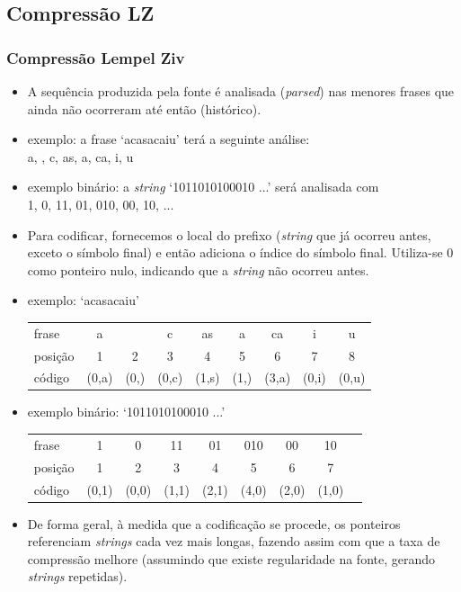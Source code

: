 

\subsection{Compressão LZ}

\begin{frame}[allowframebreaks]
  \frametitle{Compressão Lempel Ziv}

  \begin{itemize}
  \item A sequência produzida pela fonte é analisada (\textit{parsed})
	nas menores frases que ainda não ocorreram até então (histórico).
  \item exemplo: a frase `a\textvisiblespace casa\textvisiblespace caiu'
	terá a seguinte análise: \\
	a, \textvisiblespace, c, as, a\textvisiblespace, ca, i, u
  \item exemplo binário: a \textit{string} `1011010100010 ...' será analisada com\\
	1, 0, 11, 01, 010, 00, 10, ...

  \item Para codificar, fornecemos o local do prefixo (\textit{string} que já
	ocorreu antes, exceto o símbolo final) e então adiciona o índice do
	símbolo final. Utiliza-se $0$ como ponteiro nulo, indicando que a \textit{string}
	não ocorreu antes.

  \item exemplo: `a\textvisiblespace casa\textvisiblespace caiu' \\
	\begin{tabular}{lcccccccc}
	frase   & a 	& \textvisiblespace 	& c 	& as 	& a\textvisiblespace 	& ca 	& i 	& u \\
	posição & 1 	& 2			& 3 	& 4 	& 5 			& 6 	& 7 	& 8 \\
	código  & (0,a) & (0,\textvisiblespace) & (0,c) & (1,s) & (1,\textvisiblespace)	& (3,a) & (0,i) & (0,u) 
	\end{tabular}

  \item exemplo binário: `1011010100010 ...' \\
	\begin{tabular}{lcccccccc}
        frase   & 1	& 0	& 11	& 01	& 010	& 00	& 10	\\ 
	posição & 1 	& 2 	& 3 	& 4	& 5	& 6 	& 7	\\
	código  & (0,1) & (0,0) & (1,1) & (2,1) & (4,0) & (2,0) & (1,0) 
	\end{tabular}

  \item De forma geral, à medida que a codificação se procede, os ponteiros referenciam
	\textit{strings} cada vez mais longas, fazendo assim com que a taxa de compressão melhore
	(assumindo que existe regularidade na fonte, gerando \textit{strings} repetidas).
  \end{itemize}

\end{frame}

